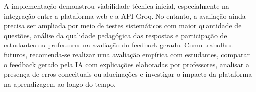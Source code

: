 \documentclass[
12pt,
openright,
oneside,
a4paper,
brazil
]{abntex2}
\begin{document}
A implementação demonstrou viabilidade técnica inicial, especialmente na integração entre a plataforma web e a API Groq. No entanto, a avaliação ainda precisa ser ampliada por meio de testes sistemáticos com maior quantidade de questões, análise da qualidade pedagógica das respostas e participação de estudantes ou professores na avaliação do feedback gerado.
Como trabalhos futuros, recomenda-se realizar uma avaliação empírica com estudantes, comparar o feedback gerado pela IA com explicações elaboradas por professores, analisar a presença de erros conceituais ou alucinações e investigar o impacto da plataforma na aprendizagem ao longo do tempo.



\postextual
\end{document}
